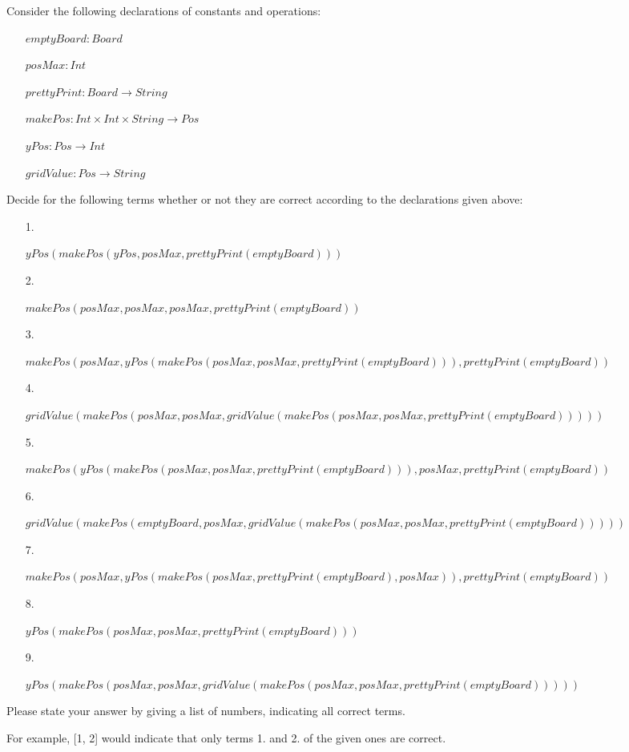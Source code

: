 Consider the following declarations of constants and operations:

\begin{itemize}
\item[] \parbox[t]{\linewidth}{$\mathit{emptyBoard} : \mathit{Board}$}
\item[] \parbox[t]{\linewidth}{$\mathit{posMax} : \mathit{Int}$}
\item[] \parbox[t]{\linewidth}{$\mathit{prettyPrint} : \mathit{Board} \to \mathit{String}$}
\item[] \parbox[t]{\linewidth}{$\mathit{makePos} : \mathit{Int} \times \mathit{Int} \times \mathit{String} \to \mathit{Pos}$}
\item[] \parbox[t]{\linewidth}{$\mathit{yPos} : \mathit{Pos} \to \mathit{Int}$}
\item[] \parbox[t]{\linewidth}{$\mathit{gridValue} : \mathit{Pos} \to \mathit{String}$}\end{itemize}Decide for the following terms whether or not they are correct according to the declarations given above:

\begin{itemize}
\item[1.]\parbox[t]{\linewidth}{$yPos(makePos(yPos,posMax,prettyPrint(emptyBoard)))$}
\item[2.]\parbox[t]{\linewidth}{$makePos(posMax,posMax,posMax,prettyPrint(emptyBoard))$}
\item[3.]\parbox[t]{\linewidth}{$makePos(posMax,yPos(makePos(posMax,posMax,prettyPrint(emptyBoard))),prettyPrint(emptyBoard))$}
\item[4.]\parbox[t]{\linewidth}{$gridValue(makePos(posMax,posMax,gridValue(makePos(posMax,posMax,prettyPrint(emptyBoard)))))$}
\item[5.]\parbox[t]{\linewidth}{$makePos(yPos(makePos(posMax,posMax,prettyPrint(emptyBoard))),posMax,prettyPrint(emptyBoard))$}
\item[6.]\parbox[t]{\linewidth}{$gridValue(makePos(emptyBoard,posMax,gridValue(makePos(posMax,posMax,prettyPrint(emptyBoard)))))$}
\item[7.]\parbox[t]{\linewidth}{$makePos(posMax,yPos(makePos(posMax,prettyPrint(emptyBoard),posMax)),prettyPrint(emptyBoard))$}
\item[8.]\parbox[t]{\linewidth}{$yPos(makePos(posMax,posMax,prettyPrint(emptyBoard)))$}
\item[9.]\parbox[t]{\linewidth}{$yPos(makePos(posMax,posMax,gridValue(makePos(posMax,posMax,prettyPrint(emptyBoard)))))$}\end{itemize}Please state your answer by giving a list of numbers, indicating all correct terms.

For example, [1, 2] would indicate that only terms 1. and 2. of the given ones are correct.

